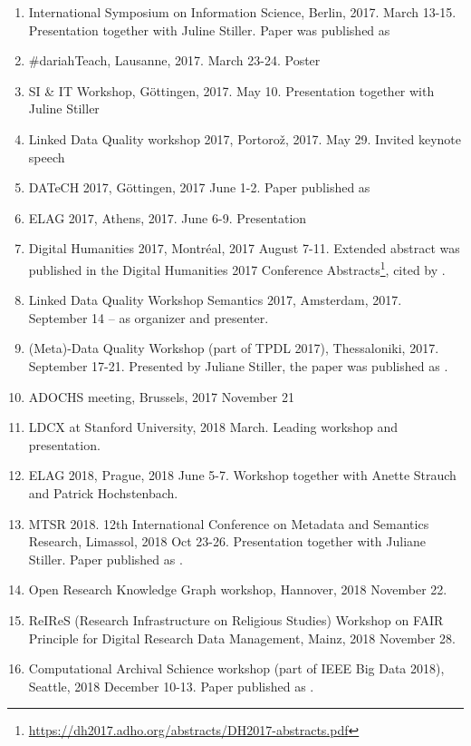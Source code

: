 \begin{enumerate}
\item International Symposium on Information Science, Berlin, 2017. March 13-15. Presentation together with Juline Stiller. Paper was published as \cite{stiller-kiraly2017}
\item \#dariahTeach, Lausanne, 2017. March 23-24. Poster
\item SI & IT Workshop, Göttingen, 2017. May 10. Presentation together with Juline Stiller
\item Linked Data Quality workshop 2017, Portorož, 2017. May 29. Invited keynote speech
\item DATeCH 2017, Göttingen, 2017 June 1-2. Paper published as \cite{kiraly2017}
\item ELAG 2017, Athens, 2017. June 6-9. Presentation
\item Digital Humanities 2017, Montréal, 2017 August 7-11. Extended abstract was published in the Digital Humanities 2017 Conference Abstracts\footnote{\url{https://dh2017.adho.org/abstracts/DH2017-abstracts.pdf}}, cited by \cite{khan2018}.
\item Linked Data Quality Workshop Semantics 2017, Amsterdam, 2017. September 14 -- as organizer and presenter.
\item (Meta)-Data Quality Workshop (part of TPDL 2017), Thessaloniki, 2017. September 17-21. Presented by Juliane Stiller, the paper was published as \cite{charles2017}.
\item ADOCHS meeting, Brussels, 2017 November 21
\item LDCX at Stanford University, 2018 March. Leading workshop and presentation.
\item ELAG 2018, Prague, 2018 June 5-7. Workshop together with Anette Strauch and Patrick Hochstenbach.
\item MTSR 2018. 12th International Conference on Metadata and Semantics Research, Limassol, 2018 Oct 23-26. Presentation together with Juliane Stiller. Paper published as \cite{kiraly-et-al2018}.
\item Open Research Knowledge Graph workshop, Hannover, 2018 November 22.
\item ReIReS (Research Infrastructure on Religious Studies) Workshop on FAIR Principle for Digital Research Data Management, Mainz, 2018 November 28.
\item Computational Archival Schience workshop (part of IEEE Big Data 2018), Seattle, 2018 December 10-13. Paper published as \cite{kiraly2018}.
\end{enumerate}



